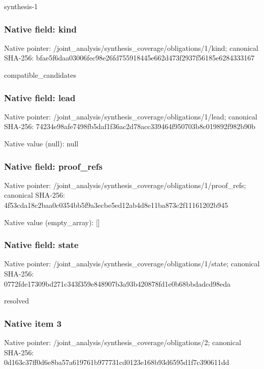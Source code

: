 \documentclass[10pt,a4paper]{article}
\begin{document}
\begingroup\raggedright\sloppy synthesis-1\par\endgroup

\subsubsection{Native field: kind}
Native pointer: /joint\_\allowbreak{}analysis/synthesis\_\allowbreak{}coverage/obligations/1/kind; canonical SHA-256: bfae5f6daa03006fec98e26fd755918445e662d473f2937f56185e6284333167

\begingroup\raggedright\sloppy compatible\_\allowbreak{}candidates\par\endgroup

\subsubsection{Native field: lead}
Native pointer: /joint\_\allowbreak{}analysis/synthesis\_\allowbreak{}coverage/obligations/1/lead; canonical SHA-256: 74234e98afe7498fb5daf1f36ac2d78acc339464f950703b8c019892f982b90b

Native value (null): null

\subsubsection{Native field: proof\_\allowbreak{}refs}
Native pointer: /joint\_\allowbreak{}analysis/synthesis\_\allowbreak{}coverage/obligations/1/proof\_\allowbreak{}refs; canonical SHA-256: 4f53cda18c2baa0c0354bb5f9a3ecbe5ed12ab4d8e11ba873c2f11161202b945

Native value (empty\_\allowbreak{}array): []

\subsubsection{Native field: state}
Native pointer: /joint\_\allowbreak{}analysis/synthesis\_\allowbreak{}coverage/obligations/1/state; canonical SHA-256: 0772fde17309bd271c343f359e848907b3a93b420878fd1e0b68bbdadcd98eda

\begingroup\raggedright\sloppy resolved\par\endgroup

\subsubsection{Native item 3}
Native pointer: /joint\_\allowbreak{}analysis/synthesis\_\allowbreak{}coverage/obligations/2; canonical SHA-256: 0d163c37ff0d6e8ba57a619761b977731cd0123e168b93d6595d1f7c390611dd
\end{document}
